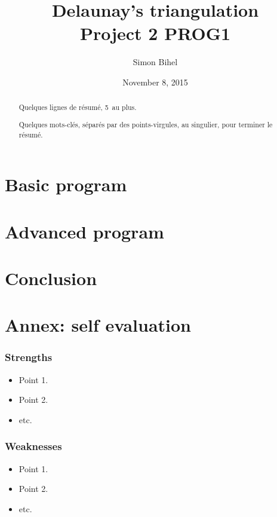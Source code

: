\documentclass[a4paper,11pt]{article}%
\newenvironment{keywords}%
{\description\item[Keyword.]}%
{\enddescription}
\begin{document}
\title{Delaunay's triangulation \\ Project 2 PROG1}

\author{Simon Bihel}

\date{November 8, 2015}

\maketitle

\begin{abstract}
  Quelques lignes de résumé, 5~au plus.
\begin{keywords}
 Quelques mots-clés, séparés par des points-virgules, au singulier,
 pour terminer le résumé.
\end{keywords}
\end{abstract}


\section{Basic program}


\section{Advanced program}



\section{Conclusion}


\clearpage %

\appendix %


\section{Annex: self evaluation}

\subsubsection*{Strengths}
\begin{itemize}
\item Point 1.
\item Point 2.
\item etc.
\end{itemize}

\subsubsection*{Weaknesses}
\begin{itemize}
\item Point 1.
\item Point 2.
\item etc.
\end{itemize}
\end{document}
